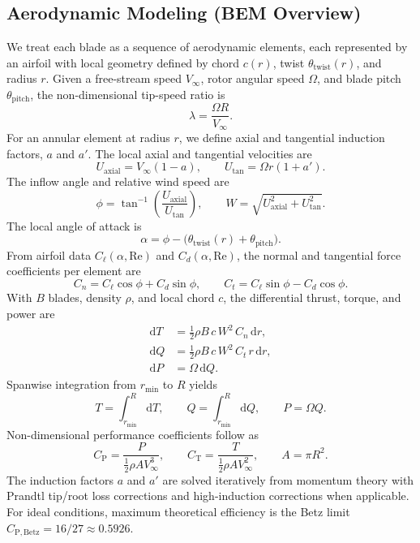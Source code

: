 \documentclass[11pt]{article}
\begin{document}
\subsection{Aerodynamic Modeling (BEM Overview)}
We treat each blade as a sequence of aerodynamic elements, each represented by an airfoil with local geometry defined by chord \(c(r)\), twist \(\theta_\mathrm{twist}(r)\), and radius \(r\). Given a free-stream speed \(V_\infty\), rotor angular speed \(\Omega\), and blade pitch \(\theta_\mathrm{pitch}\), the non-dimensional tip-speed ratio is
\begin{equation}
\lambda = \frac{\Omega R}{V_\infty}.
\label{eq:tsr}
\end{equation}
For an annular element at radius \(r\), we define axial and tangential induction factors, \(a\) and \(a'\). The local axial and tangential velocities are
\begin{equation}
U_\mathrm{axial} = V_\infty (1 - a),\qquad U_\mathrm{tan} = \Omega r (1 + a').
\end{equation}
The inflow angle and relative wind speed are
\begin{equation}
\phi = \tan^{-1}\!\left( \frac{U_\mathrm{axial}}{U_\mathrm{tan}} \right),\qquad W = \sqrt{U_\mathrm{axial}^2 + U_\mathrm{tan}^2}.
\end{equation}
The local angle of attack is
\begin{equation}
\alpha = \phi - \big(\theta_\mathrm{twist}(r) + \theta_\mathrm{pitch}\big).
\end{equation}
From airfoil data \(C_\ell(\alpha,\mathrm{Re})\) and \(C_d(\alpha,\mathrm{Re})\), the normal and tangential force coefficients per element are
\begin{equation}
C_n = C_\ell\cos\phi + C_d\sin\phi, \qquad C_t = C_\ell\sin\phi - C_d\cos\phi.
\end{equation}
With \(B\) blades, density \(\rho\), and local chord \(c\), the differential thrust, torque, and power are
\begin{align}
\mathrm{d}T &= \tfrac{1}{2} \rho B\, c\, W^2\, C_n\, \mathrm{d}r, \\
\mathrm{d}Q &= \tfrac{1}{2} \rho B\, c\, W^2\, C_t\, r\, \mathrm{d}r, \\
\mathrm{d}P &= \Omega\, \mathrm{d}Q.
\end{align}
Spanwise integration from \(r_{\min}\) to \(R\) yields
\begin{equation}
T = \int_{r_{\min}}^R \mathrm{d}T, \qquad Q = \int_{r_{\min}}^R \mathrm{d}Q, \qquad P = \Omega Q.
\end{equation}
Non-dimensional performance coefficients follow as
\begin{equation}
C_\mathrm{P} = \frac{P}{\tfrac{1}{2} \rho A V_\infty^3}, \qquad C_\mathrm{T} = \frac{T}{\tfrac{1}{2} \rho A V_\infty^2}, \qquad A = \pi R^2.
\end{equation}
The induction factors \(a\) and \(a'\) are solved iteratively from momentum theory with Prandtl tip/root loss corrections and high-induction corrections when applicable. For ideal conditions, maximum theoretical efficiency is the Betz limit \(C_\mathrm{P,Betz} = 16/27 \approx 0.5926\).
\end{document}
